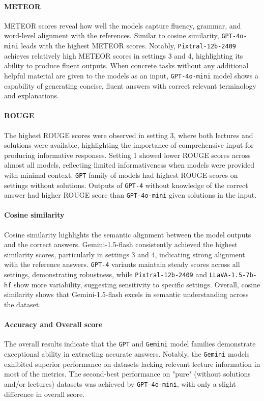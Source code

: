 \documentclass{article}
\begin{document}
\paragraph{METEOR}
METEOR scores reveal how well the models capture fluency, grammar, and word-level alignment with the references. Similar to cosine similarity, \texttt{GPT-4o-mini} leads with the highest METEOR scores. Notably, \texttt{Pixtral-12b-2409} achieves relatively high METEOR scores in settings 3 and 4, highlighting its ability to produce fluent outputs. When concrete tasks without any additional helpful material are given to the models as an input, \texttt{GPT-4o-mini} model shows a capability of generating concise, fluent answers with correct relevant terminology and explanations.

\paragraph{ROUGE}
The highest ROUGE scores were observed in setting 3, where both lectures and solutions were available, highlighting the importance of comprehensive input for producing informative responses. Setting 1 showed lower ROUGE scores across almost all models, reflecting limited informativeness when models were provided with minimal context.  \texttt{GPT} family of models had highest ROUGE-scores on settings without solutions. Outputs of \texttt{GPT-4} without knowledge of the correct answer had higher ROUGE score than \texttt{GPT-4o-mini} given solutions in the input.


\paragraph{Cosine similarity}
Cosine similarity highlights the semantic alignment between the model outputs and the correct answers. {Gemini-1.5-flash} consistently achieved the highest similarity scores, particularly in settings 3 and 4, indicating strong alignment with the reference answers. \texttt{GPT-4} variants maintain steady scores across all settings, demonstrating robustness, while \texttt{Pixtral-12b-2409} and \texttt{LLaVA-1.5-7b-hf} show more variability, suggesting sensitivity to specific settings. Overall, cosine similarity shows that {Gemini-1.5-flash} excels in semantic understanding across the dataset.

\paragraph{Accuracy and Overall score}
The overall results indicate that the \texttt{GPT} and \texttt{Gemini} model families demonstrate exceptional ability in extracting accurate answers. Notably, the \texttt{Gemini} models exhibited superior performance on datasets lacking relevant lecture information in most of the metrics. The second-best performance on "pure" (without solutions and/or lectures) datasets was achieved by \texttt{GPT-4o-mini}, with only a slight difference in overall score.
\end{document}
